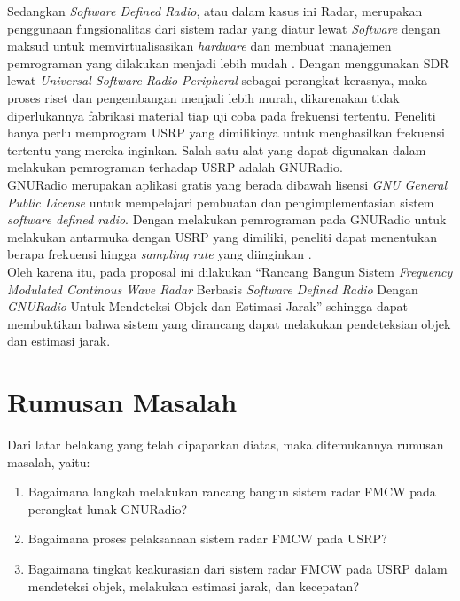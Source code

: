 Sedangkan \textit{Software Defined Radio}, atau dalam kasus ini Radar, merupakan penggunaan fungsionalitas dari sistem radar yang diatur lewat \textit{Software} dengan maksud untuk memvirtualisasikan \textit{hardware} dan membuat manajemen pemrograman yang dilakukan menjadi lebih mudah \cite{Zeng2019}. Dengan menggunakan SDR lewat \textit{Universal Software Radio Peripheral} sebagai perangkat kerasnya, maka proses riset dan pengembangan menjadi lebih murah, dikarenakan tidak diperlukannya fabrikasi material tiap uji coba pada frekuensi tertentu. Peneliti hanya perlu memprogram USRP yang dimilikinya untuk menghasilkan frekuensi tertentu yang mereka inginkan. Salah satu alat yang dapat digunakan dalam melakukan pemrograman terhadap USRP adalah GNURadio.\\


GNURadio merupakan aplikasi gratis yang berada dibawah lisensi \textit{GNU General Public License} untuk mempelajari pembuatan dan pengimplementasian sistem \textit{software defined radio}. Dengan melakukan pemrograman pada GNURadio untuk melakukan antarmuka dengan USRP yang dimiliki, peneliti dapat menentukan berapa frekuensi hingga \textit{sampling rate} yang diinginkan \cite{Prabaswara2011}.\\


Oleh karena itu, pada proposal ini dilakukan “Rancang Bangun Sistem \textit{Frequency Modulated Continous Wave Radar }Berbasis \textit{Software Defined Radio} Dengan \textit{GNURadio }Untuk Mendeteksi Objek dan Estimasi Jarak” sehingga dapat membuktikan bahwa sistem yang dirancang dapat melakukan pendeteksian objek dan estimasi jarak.

\section{Rumusan Masalah}
Dari latar belakang yang telah dipaparkan diatas, maka ditemukannya rumusan masalah, yaitu:
\begin{enumerate}
	\item Bagaimana langkah melakukan rancang bangun sistem radar FMCW pada perangkat lunak GNURadio?
	\item Bagaimana proses pelaksanaan sistem radar FMCW pada USRP?
	\item Bagaimana tingkat keakurasian dari sistem radar FMCW pada USRP dalam mendeteksi objek, melakukan estimasi jarak, dan kecepatan?
\end{enumerate} 

